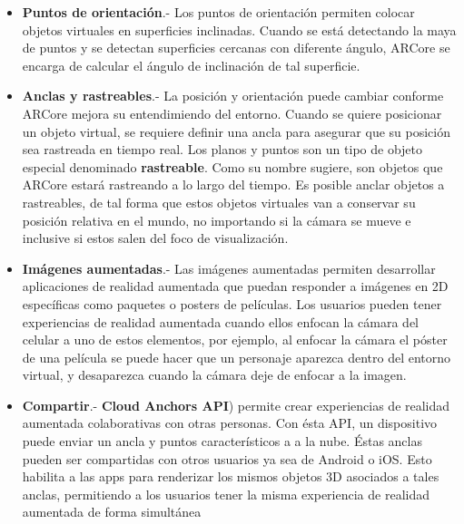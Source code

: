 \begin{itemize}
	\item \textbf{Puntos de orientación}.- Los puntos de orientación permiten colocar objetos virtuales en superficies inclinadas. Cuando se está detectando la maya de puntos y se detectan superficies cercanas con diferente ángulo, ARCore se encarga de calcular el ángulo de inclinación de tal superficie.
	
	\item \textbf{Anclas y rastreables}.- La posición y orientación puede cambiar conforme ARCore mejora su entendimiendo del entorno. Cuando se quiere posicionar un objeto virtual, se requiere definir una ancla para asegurar que su posición sea rastreada en tiempo real. Los planos y puntos son un tipo de objeto especial denominado \textbf{rastreable}. Como su nombre sugiere, son objetos que ARCore estará rastreando a lo largo del tiempo. Es posible anclar objetos a rastreables, de tal forma que estos objetos virtuales van a conservar su posición relativa en el mundo, no importando si la cámara se mueve e inclusive si estos salen del foco de visualización.
	
	\item \textbf{Imágenes aumentadas}.- Las imágenes aumentadas permiten desarrollar aplicaciones de realidad aumentada que puedan responder a imágenes en 2D específicas como paquetes o posters de películas. Los usuarios pueden tener experiencias de realidad aumentada cuando ellos enfocan la cámara del celular a uno de estos elementos, por ejemplo, al enfocar la cámara el póster de una película se puede hacer que un personaje aparezca dentro del entorno virtual, y desaparezca cuando la cámara deje de enfocar a la imagen.
	
	\item \textbf{Compartir}.- \textbf{Cloud Anchors API}) permite crear experiencias de realidad aumentada colaborativas con otras personas. Con ésta API, un dispositivo puede enviar un ancla y puntos característicos a a la nube. Éstas anclas pueden ser compartidas con otros usuarios ya sea de Android o iOS. Esto habilita a las apps para renderizar los mismos objetos 3D asociados a tales anclas, permitiendo a los usuarios tener la misma experiencia de realidad aumentada de forma simultánea
	
\end{itemize}

